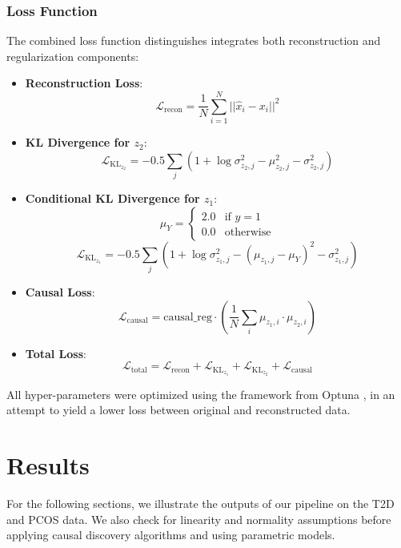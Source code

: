\documentclass[12pt,letterpaper]{article}
\begin{document}
\subsubsection{Loss Function}

The combined loss function distinguishes integrates both reconstruction and regularization components:

\begin{itemize}
    \item \textbf{Reconstruction Loss}:
    \[
    \mathcal{L}_{\text{recon}} = \frac{1}{N} \sum_{i=1}^{N} ||\hat{x}_i - x_i||^2
    \]

    \item \textbf{KL Divergence for $z_2$}:
    \[
    \mathcal{L}_{\text{KL}_{z_2}} = -0.5 \sum_{j} (1 + \log \sigma_{z_2,j}^2 - \mu_{z_2,j}^2 - \sigma_{z_2,j}^2)
    \]

    \item \textbf{Conditional KL Divergence for $z_1$}:
    \[
    \mu_Y = 
    \begin{cases} 
    2.0 & \text{if } y = 1 \\
    0.0 & \text{otherwise} 
    \end{cases}
    \]
    \[
    \mathcal{L}_{\text{KL}_{z_1}} = -0.5 \sum_{j} \left(1 + \log \sigma_{z_1,j}^2 - (\mu_{z_1,j} - \mu_Y)^2 - \sigma_{z_1,j}^2\right)
    \]

    \item \textbf{Causal Loss}:
    \[
    \mathcal{L}_{\text{causal}} = \text{causal\_reg} \cdot \left(\frac{1}{N} \sum_{i} \mu_{z_1,i} \cdot \mu_{z_2,i}\right)
    \]

    \item \textbf{Total Loss}:
    \[
    \mathcal{L}_{\text{total}} = \mathcal{L}_{\text{recon}} + \mathcal{L}_{\text{KL}_{z_1}} + \mathcal{L}_{\text{KL}_{z_2}} + \mathcal{L}_{\text{causal}}
    \]
\end{itemize}

All hyper-parameters were optimized using the framework from Optuna \citep{optuna_2019}, in an attempt to yield a lower loss between original and reconstructed data.

\section{Results}

For the following sections, we illustrate the outputs of our pipeline on the T2D and PCOS data. We also check for linearity and normality assumptions before applying causal discovery algorithms and using parametric models. 
\end{document}
